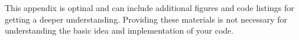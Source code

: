 \chapter{\LangAppendix}
This appendix is optinal and can include additional figures and code listings for getting a deeper understanding. Providing these materials is not necessary for understanding the basic idea and implementation of your code.